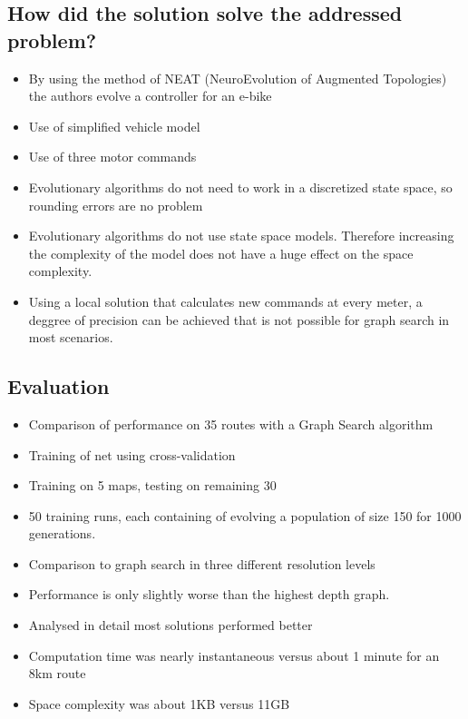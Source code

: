 \documentclass[paper=a4, fontsize=11pt]{scrartcl} %
\numberwithin{equation}{section} %
\numberwithin{figure}{section} %
\numberwithin{table}{section} %
\begin{document}
\subsection{How did the solution solve the addressed problem?}
\begin{itemize}
	\item By using the method of NEAT (NeuroEvolution of Augmented Topologies) the authors evolve a controller for an e-bike 
	\item Use of simplified vehicle model 
	\item Use of three motor commands
	\item Evolutionary algorithms do not need to work in a discretized state space, so rounding errors are no problem
	\item Evolutionary algorithms do not use state space models. Therefore increasing the complexity of the model does not have a huge effect on the space complexity.
	\item Using a local solution that calculates new commands at every meter, a deggree of precision can be achieved that is not possible for graph search in most scenarios.
\end{itemize}


\subsection{Evaluation}
\begin{itemize}
	\item Comparison of performance on 35 routes with a Graph Search algorithm
	\item Training of net using cross-validation
	\item Training on 5 maps, testing on remaining 30
	\item 50 training runs, each containing of evolving a population of size 150 for 1000 generations.
	\item Comparison to graph search in three different resolution levels
	\item Performance is only slightly worse than the highest depth graph.
	\item Analysed in detail most solutions performed better
	\item Computation time was nearly instantaneous versus about 1 minute for an 8km route
	\item Space complexity was about 1KB versus 11GB
\end{itemize}
\end{document}
